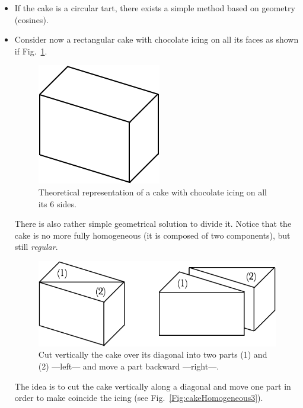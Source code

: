 \begin{itemize}
\item If the cake is a circular tart, there exists a simple method based on geometry (cosines).
\item Consider now a rectangular cake with chocolate icing on all its faces as shown if Fig.~\ref{Fig:cakeHomogeneous1}.
\begin{figure}[htb]
\begin{center}
        \includegraphics[scale=0.4]{FiguresMaths/CakeHomogeneous1}
        \caption{Theoretical representation of a cake with chocolate icing on all its 6 sides.}
        \label{Fig:cakeHomogeneous1}
\end{center}
\end{figure}
There is also rather simple geometrical solution to divide it. 
Notice that the cake is no more fully homogeneous (it is composed of two components), but still \textit{regular}. 
\begin{figure}[htb]
\begin{center}
        \includegraphics[scale=0.4]{FiguresMaths/CakeHomogeneous2}
        \caption{Cut vertically the cake over its diagonal into two parts (1) and (2) ---left--- and move a part backward ---right---.}
        \label{Fig:cakeHomogeneous2}
\end{center}
\end{figure}
The idea is to cut the cake vertically along a diagonal and move one part in order to make coincide the icing
(see Fig.~\ref{Fig:cakeHomogeneous3}).
\begin{figure}[htb]

\end{figure}
\end{itemize}

